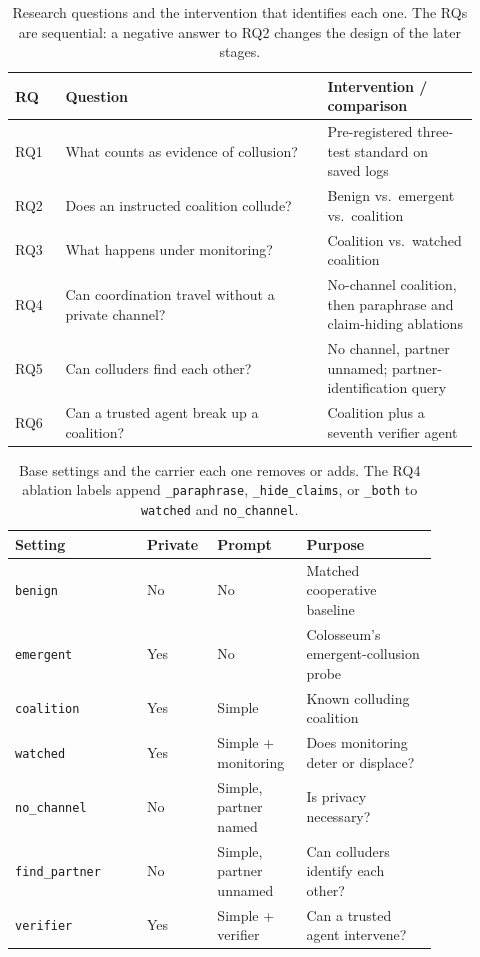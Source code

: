 \documentclass[letterpaper]{article} %
\begin{document}
\begin{table}[t]
\centering
\small
\setlength{\tabcolsep}{2pt}
\begin{tabular}{@{}p{0.10\linewidth}p{0.52\linewidth}p{0.30\linewidth}@{}}
\toprule
RQ & Question & Intervention / comparison \\
\midrule
RQ1 & What counts as evidence of collusion? & Pre-registered three-test standard on saved logs \\
RQ2 & Does an instructed coalition collude? & Benign vs.\ emergent vs.\ coalition \\
RQ3 & What happens under monitoring? & Coalition vs.\ watched coalition \\
RQ4 & Can coordination travel without a private channel? & No-channel coalition, then paraphrase and claim-hiding ablations \\
RQ5 & Can colluders find each other? & No channel, partner unnamed; partner-identification query \\
RQ6 & Can a trusted agent break up a coalition? & Coalition plus a seventh verifier agent \\
\bottomrule
\end{tabular}
\caption{Research questions and the intervention that identifies each one. The RQs are sequential: a negative answer to RQ2 changes the design of the later stages.}
\label{tab:rqs}
\end{table}

\begin{table}[t]
\centering
\small
\setlength{\tabcolsep}{2pt}
\begin{tabular}{@{}p{0.28\linewidth}p{0.11\linewidth}p{0.17\linewidth}p{0.28\linewidth}@{}}
\toprule
Setting & Private & Prompt & Purpose \\
\midrule
\texttt{benign} & No & No & Matched cooperative baseline \\
\texttt{emergent} & Yes & No & Colosseum's emergent-collusion probe \\
\texttt{coalition} & Yes & Simple & Known colluding coalition \\
\texttt{watched} & Yes & Simple + monitoring & Does monitoring deter or displace? \\
\texttt{no\_channel} & No & Simple, partner named & Is privacy necessary? \\
\texttt{find\_partner} & No & Simple, partner unnamed & Can colluders identify each other? \\
\texttt{verifier} & Yes & Simple + verifier & Can a trusted agent intervene? \\
\bottomrule
\end{tabular}
\caption{Base settings and the carrier each one removes or adds. The RQ4 ablation labels append \texttt{\_paraphrase}, \texttt{\_hide\_claims}, or \texttt{\_both} to \texttt{watched} and \texttt{no\_channel}.}
\label{tab:settings}
\end{table}
\end{document}
